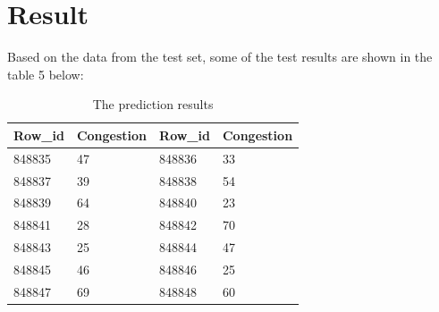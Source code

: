 \section{Result} \label{sec-conclusions}
Based on the data from the test set, some of the test results are shown in the table 5 below:\par
\begin{table}[htb]
	\setlength{\abovecaptionskip}{10pt}
	\setlength{\belowcaptionskip}{15pt}
	\centering
	\caption{The prediction results}
	
	\begin{tabular}{p{2.5cm}p{2.5cm}p{2.5cm}p{2.5cm}}
		\hline
		Row_id & Congestion  &  Row_id & Congestion \\
		\hline
		848835 & 47 & 848836 & 33\\
		848837 & 39 & 848838 & 54\\
		848839 & 64 & 848840 & 23\\
		848841 & 28 & 848842 & 70\\
		848843 & 25 & 848844 & 47\\
		848845 & 46 & 848846 & 25\\
		848847 & 69 & 848848 & 60\\
		\hline
	\end{tabular}
\end{table}




